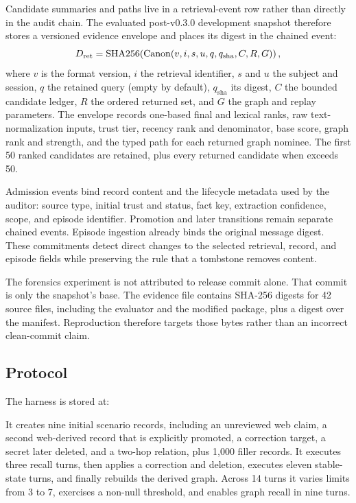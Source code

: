 Candidate summaries and paths live in a retrieval-event row rather than
directly in the audit chain. The evaluated post-v0.3.0 development snapshot
therefore stores a versioned evidence envelope and places its digest in the
chained  event:
\begin{equation}
D_{\mathrm{ret}}=\operatorname{SHA256}\!\left(\operatorname{Canon}(v,i,s,u,q,q_{\mathrm{sha}},C,R,G)\right),
\label{eq:retrieval-binding}
\end{equation}
where $v$ is the format version, $i$ the retrieval identifier, $s$ and $u$
the subject and session, $q$ the retained query (empty by default),
$q_{\mathrm{sha}}$
its digest, $C$ the bounded candidate ledger, $R$ the ordered returned set,
and $G$ the graph and replay parameters. The envelope records one-based final
and lexical ranks, raw text-normalization inputs, trust tier, recency rank and
denominator, base score, graph rank and strength, and the typed path for each
returned graph nominee. The first 50 ranked candidates are retained, plus
every returned candidate when  exceeds 50.

Admission events bind record content and the lifecycle metadata used by the
auditor: source type, initial trust and status, fact key, extraction
confidence, scope, and episode identifier. Promotion and later transitions
remain separate chained events. Episode ingestion already binds the original
message digest. These commitments detect direct changes to the selected
retrieval, record, and episode fields while preserving the rule that a
tombstone removes content.

The forensics experiment is not attributed to release commit
 alone. That commit is only the snapshot's base. The evidence
file contains SHA-256 digests for 42 source files, including the evaluator and
the modified package, plus a digest over the manifest. Reproduction therefore
targets those bytes rather than an incorrect clean-commit claim.

\subsection{Protocol}
\label{sec:forensics-protocol}

The harness is stored at:
\begin{center}
\end{center}
It creates nine initial scenario records, including an unreviewed web claim,
a second web-derived record that is explicitly promoted, a correction target,
a secret later deleted, and a two-hop relation, plus 1{,}000 filler records.
It executes three recall turns, then applies a correction and deletion,
executes eleven stable-state turns, and finally rebuilds the derived graph.
Across 14 turns it varies limits from 3 to 7, exercises a non-null threshold,
and enables graph recall in nine turns.

